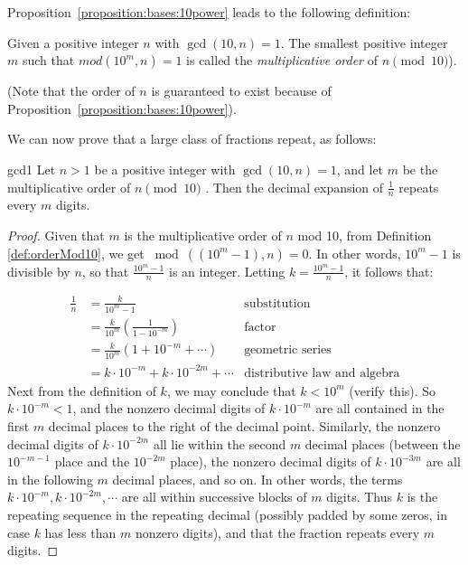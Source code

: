 Proposition~\ref{proposition:bases:10power} leads to the following definition:

\begin{defn}\label{def:orderMod10}
Given a positive integer $n$ with $\gcd(10,n)=1$. The smallest positive integer $m$ such that $mod(10^{m},n)=1$  is called the \textit{multiplicative order} of $n \pmod{10}$).\\
\noindent

(Note that the order of $n$ is guaranteed to exist because of Proposition~\ref{proposition:bases:10power}).
\end{defn}
\noindent

We can now prove that a large class of fractions  repeat, as follows:

\begin{prop}{gcd1}
Let $n>1$ be a positive integer with $\gcd(10,n)=1$, and let $m$ be the multiplicative order of $n \pmod{10}$ . Then the decimal expansion of $\frac{1}{n}$ repeats every $m$ digits.
\end{prop}
\begin{proof}
Given that $m$ is the multiplicative order of $n$ mod 10, from Definition \ref{def:orderMod10}, we get $\bmod((10^{m}-1),n)=0$. In other words, $10^{m}-1$ is divisible by $n$, so that $\frac{10^{m}-1}{n}$ is an integer. Letting $k=\frac{10^{m}-1}{n}$,  it follows that:

\begin{align*}
\frac{1}{n}&=\frac{k}{10^{m}-1} & \text{substitution}\\
&=\frac{k}{10^{m}}\left(\frac{1}{1-10^{-m}}\right) & \text{factor}\\
&=\frac{k}{10^{m}}\left(1+10^{-m}+\cdots\right) &\text{geometric series}\\
&=k \cdot 10^{-m}+ k \cdot 10^{-2m}+\cdots  &\text{distributive law and algebra}
\end{align*}
Next from the definition of $k$, we may conclude that $k < 10^m$ (verify this). So $k\cdot 10^{-m}<1$, and  the nonzero decimal digits of $k\cdot 10^{-m}$ are all contained in the first $m$ decimal places to the right of the decimal point. Similarly, the nonzero decimal digits of $k\cdot 10^{-2m}$ all lie within the second $m$ decimal places (between the $10^{-m-1}$ place and the $10^{-2m}$ place), the  nonzero decimal digits of $k\cdot 10^{-3m}$ are all in the following $m$ decimal places, and so on. In other words,  the terms $k \cdot 10^{-m},  k \cdot 10^{-2m}, \cdots$ are all within successive blocks of $m$  digits.
Thus  $k$ is the repeating sequence in the repeating decimal (possibly padded by some zeros, in case $k$ has less than $m$ nonzero digits), and that the fraction repeats every $m$ digits.
\end{proof}

